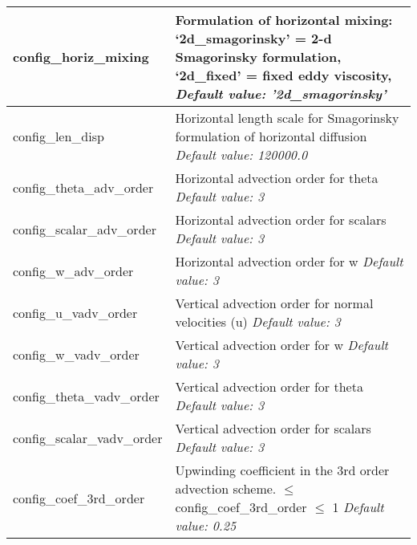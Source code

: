 {\begin{longtable}{|p{1.75in} |p{4.5in}|}
   config\_horiz\_mixing & Formulation of horizontal mixing: \newline
                                           `2d\_smagorinsky' = 2-d Smagorinsky formulation, \newline
                                           `2d\_fixed' = fixed eddy viscosity, \newline 
   {\em Default value: '2d\_smagorinsky'} \\ \hline

   config\_len\_disp & Horizontal length scale for Smagorinsky formulation of horizontal diffusion \newline 
   {\em Default value: 120000.0} \\ \hline

   config\_theta\_adv\_order & Horizontal advection order for theta \newline 
   {\em Default value: 3} \\ \hline

   config\_scalar\_adv\_order & Horizontal advection order for scalars \newline 
   {\em Default value: 3} \\ \hline

   config\_w\_adv\_order & Horizontal advection order for w \newline 
   {\em Default value: 3} \\ \hline

   config\_u\_vadv\_order & Vertical advection order for normal velocities (u) \newline 
   {\em Default value: 3} \\ \hline

   config\_w\_vadv\_order & Vertical advection order for w \newline 
   {\em Default value: 3} \\ \hline

   config\_theta\_vadv\_order & Vertical advection order for theta \newline 
   {\em Default value: 3} \\ \hline

   config\_scalar\_vadv\_order & Vertical advection order for scalars \newline 
   {\em Default value: 3} \\ \hline

   config\_coef\_3rd\_order & Upwinding coefficient in the 3rd order advection scheme. \hfill\break 0 $\le$ config\_coef\_3rd\_order $\le$ 1 \newline 
   {\em Default value: 0.25} \\ \hline
   

\end{longtable}}
